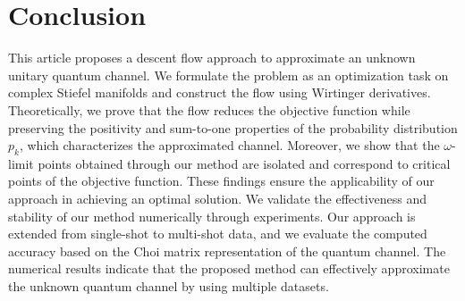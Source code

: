 \documentclass[onefignum,onetabnum]{siamart220329}
\begin{document}
{    \section{Conclusion}
    This article proposes a descent flow approach to approximate an unknown unitary quantum channel. We formulate the problem as an optimization task on complex Stiefel manifolds and construct the flow using Wirtinger derivatives. Theoretically, we prove that the flow reduces the objective function while preserving the positivity and sum-to-one properties of the probability distribution $p_k$, which characterizes the approximated channel. Moreover, we show that the $\omega$-limit points obtained through our method are isolated and correspond to critical points of the objective function. These findings ensure the applicability of our approach in achieving an optimal solution. We validate the effectiveness and stability of our method numerically through experiments. Our approach is extended from single-shot to multi-shot data, and we evaluate the computed accuracy based on the Choi matrix representation of the quantum channel. The numerical results indicate that the proposed method can effectively approximate the unknown quantum channel by using multiple datasets.
    }
    
\end{document}
